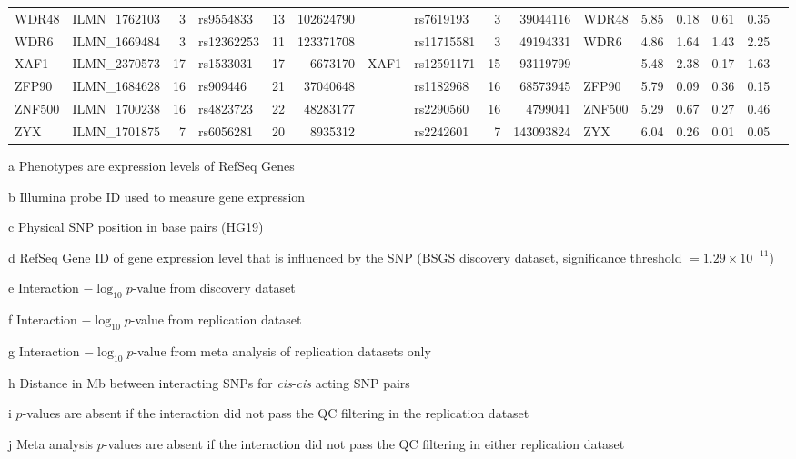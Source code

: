 \documentclass{article}
\begin{document}
\begin{landscape}
{\begin{ThreePartTable}
\begin{longtable}{|llr|lrrl|lrrl|rrrr|r|}
  WDR48 & ILMN\_1762103 & 3 & rs9554833 & 13 & 102624790 &  & rs7619193 & 3 & 39044116 & WDR48 & 5.85 & 0.18 & 0.61 & 0.35 &  \\
  WDR6 & ILMN\_1669484 & 3 & rs12362253 & 11 & 123371708 &  & rs11715581 & 3 & 49194331 & WDR6 & 4.86 & 1.64 & 1.43 & 2.25 &  \\
  XAF1 & ILMN\_2370573 & 17 & rs1533031 & 17 & 6673170 & XAF1 & rs12591171 & 15 & 93119799 &  & 5.48 & 2.38 & 0.17 & 1.63 &  \\
  ZFP90 & ILMN\_1684628 & 16 & rs909446 & 21 & 37040648 &  & rs1182968 & 16 & 68573945 & ZFP90 & 5.79 & 0.09 & 0.36 & 0.15 &  \\
  ZNF500 & ILMN\_1700238 & 16 & rs4823723 & 22 & 48283177 &  & rs2290560 & 16 & 4799041 & ZNF500 & 5.29 & 0.67 & 0.27 & 0.46 &  \\
  ZYX & ILMN\_1701875 & 7 & rs6056281 & 20 & 8935312 &  & rs2242601 & 7 & 143093824 & ZYX & 6.04 & 0.26 & 0.01 & 0.05 &  \\
   \hline
\end{longtable}

\begin{tablenotes}
\item[a] Phenotypes are expression levels of RefSeq Genes
\item[b] Illumina probe ID used to measure gene expression
\item[c] Physical SNP position in base pairs (HG19)
\item[d] RefSeq Gene ID of gene expression level that is influenced by the SNP (BSGS discovery dataset, significance threshold $= 1.29 \times 10^{-11}$)
\item[e] Interaction $-\log_{10} p$-value from discovery dataset
\item[f] Interaction $-\log_{10} p$-value from replication dataset
\item[g] Interaction $-\log_{10} p$-value from meta analysis of replication datasets only
\item[h] Distance in Mb between interacting SNPs for \emph{cis}-\emph{cis} acting SNP pairs
\item[i] $p$-values are absent if the interaction did not pass the QC filtering in the replication dataset
\item[j] Meta analysis $p$-values are absent if the interaction did not pass the QC filtering in either replication dataset

\end{tablenotes}


\end{ThreePartTable}
}
\end{landscape}
\end{document}
